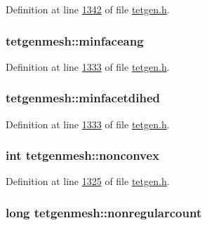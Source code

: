 Definition at line \hyperlink{tetgen_8h_source_l01342}{1342} of file \hyperlink{tetgen_8h_source}{tetgen.\+h}.

\subsubsection[{\texorpdfstring{minfaceang}{minfaceang}}]{ tetgenmesh\+::minfaceang}\hypertarget{classtetgenmesh_a6baefb6eda35b7b77f6b065425ee8247}{}\label{classtetgenmesh_a6baefb6eda35b7b77f6b065425ee8247}


Definition at line \hyperlink{tetgen_8h_source_l01333}{1333} of file \hyperlink{tetgen_8h_source}{tetgen.\+h}.

\subsubsection[{\texorpdfstring{minfacetdihed}{minfacetdihed}}]{ tetgenmesh\+::minfacetdihed}\hypertarget{classtetgenmesh_aef1e8aebb8ed75a53622d4805e4c68dd}{}\label{classtetgenmesh_aef1e8aebb8ed75a53622d4805e4c68dd}


Definition at line \hyperlink{tetgen_8h_source_l01333}{1333} of file \hyperlink{tetgen_8h_source}{tetgen.\+h}.

\subsubsection[{\texorpdfstring{nonconvex}{nonconvex}}]{\setlength{\rightskip}{0pt plus 5cm}int tetgenmesh\+::nonconvex}\hypertarget{classtetgenmesh_ab92b76b15a48ed42db8db49dc2b3a651}{}\label{classtetgenmesh_ab92b76b15a48ed42db8db49dc2b3a651}


Definition at line \hyperlink{tetgen_8h_source_l01325}{1325} of file \hyperlink{tetgen_8h_source}{tetgen.\+h}.

\subsubsection[{\texorpdfstring{nonregularcount}{nonregularcount}}]{\setlength{\rightskip}{0pt plus 5cm}long tetgenmesh\+::nonregularcount}\hypertarget{classtetgenmesh_a6619cdb6b99ed8546f2007c48b65ca3a}{}\label{classtetgenmesh_a6619cdb6b99ed8546f2007c48b65ca3a}


